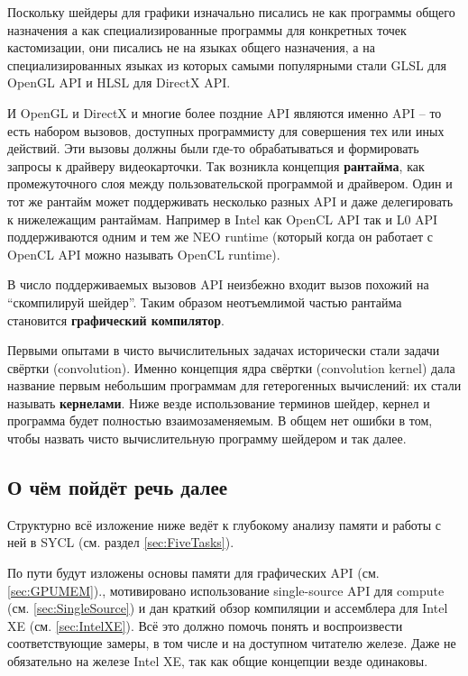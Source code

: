 \documentclass[a4paper,12pt,oneside]{article}
\begin{document}
Поскольку шейдеры для графики изначально писались не как программы общего назначения а как специализированные программы для конкретных точек кастомизации, они писались не на языках общего назначения, а на специализированных языках из которых самыми популярными стали GLSL для OpenGL API и HLSL для DirectX API.

И OpenGL и DirectX и многие более поздние API являются именно API -- то есть набором вызовов, доступных программисту для совершения тех или иных действий.
Эти вызовы должны были где-то обрабатываться и формировать запросы к драйверу видеокарточки.
Так возникла концепция \textbf{рантайма}, как промежуточного слоя между пользовательской программой и драйвером.
Один и тот же рантайм может поддерживать несколько разных API и даже делегировать к нижележащим рантаймам.
Например в Intel как OpenCL API так и L0 API поддерживаются одним и тем же NEO runtime (который когда он работает с OpenCL API можно называть OpenCL runtime).

В число поддерживаемых вызовов API неизбежно входит вызов похожий на ``скомпилируй шейдер''. Таким образом неотъемлимой частью рантайма становится \textbf{графический компилятор}.

Первыми опытами в чисто вычислительных задачах исторически стали задачи свёртки (convolution). 
Именно концепция ядра свёртки (convolution kernel) дала название первым небольшим программам для гетерогенных вычислений: их стали называть \textbf{кернелами}.
Ниже везде использование терминов шейдер, кернел и программа будет полностью взаимозаменяемым.
В общем нет ошибки в том, чтобы назвать чисто вычислительную программу шейдером и так далее.

\subsection{О чём пойдёт речь далее}\label{subsec:about}

Структурно всё изложение ниже ведёт к глубокому анализу памяти и работы с ней в SYCL (см. раздел \ref{sec:FiveTasks}).

По пути будут изложены основы памяти для графических API (см. \ref{sec:GPUMEM})., мотивировано использование single-source API для compute (см. \ref{sec:SingleSource}) и дан краткий обзор компиляции и ассемблера для Intel XE (см. \ref{sec:IntelXE}).
Всё это должно помочь понять и воспроизвести соответствующие замеры, в том числе и на доступном читателю железе.
Даже не обязательно на железе Intel XE, так как общие концепции везде одинаковы.
\end{document}
